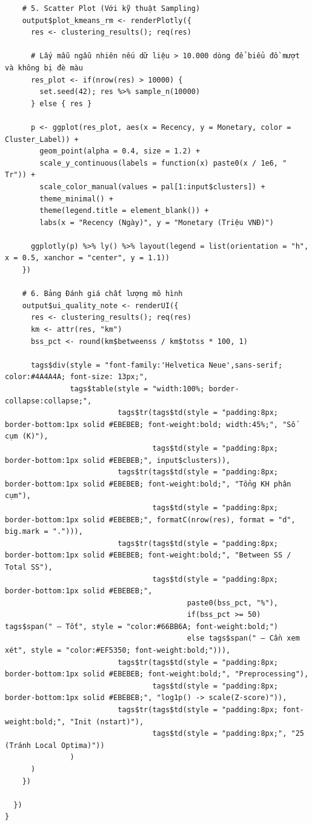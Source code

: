 \documentclass[12pt, a4paper]{article}
\begin{document}
\begin{lstlisting}
    # 5. Scatter Plot (Với kỹ thuật Sampling)
    output$plot_kmeans_rm <- renderPlotly({
      res <- clustering_results(); req(res)
      
      # Lấy mẫu ngẫu nhiên nếu dữ liệu > 10.000 dòng để biểu đồ mượt và không bị đè màu
      res_plot <- if(nrow(res) > 10000) { 
        set.seed(42); res %>% sample_n(10000) 
      } else { res }
      
      p <- ggplot(res_plot, aes(x = Recency, y = Monetary, color = Cluster_Label)) +
        geom_point(alpha = 0.4, size = 1.2) + 
        scale_y_continuous(labels = function(x) paste0(x / 1e6, " Tr")) + 
        scale_color_manual(values = pal[1:input$clusters]) +
        theme_minimal() +
        theme(legend.title = element_blank()) +
        labs(x = "Recency (Ngày)", y = "Monetary (Triệu VNĐ)")
      
      ggplotly(p) %>% ly() %>% layout(legend = list(orientation = "h", x = 0.5, xanchor = "center", y = 1.1))
    })
    
    # 6. Bảng Đánh giá chất lượng mô hình
    output$ui_quality_note <- renderUI({
      res <- clustering_results(); req(res)
      km <- attr(res, "km")
      bss_pct <- round(km$betweenss / km$totss * 100, 1)
      
      tags$div(style = "font-family:'Helvetica Neue',sans-serif; color:#4A4A4A; font-size: 13px;",
               tags$table(style = "width:100%; border-collapse:collapse;",
                          tags$tr(tags$td(style = "padding:8px; border-bottom:1px solid #EBEBEB; font-weight:bold; width:45%;", "Số cụm (K)"),
                                  tags$td(style = "padding:8px; border-bottom:1px solid #EBEBEB;", input$clusters)),
                          tags$tr(tags$td(style = "padding:8px; border-bottom:1px solid #EBEBEB; font-weight:bold;", "Tổng KH phân cụm"),
                                  tags$td(style = "padding:8px; border-bottom:1px solid #EBEBEB;", formatC(nrow(res), format = "d", big.mark = "."))),
                          tags$tr(tags$td(style = "padding:8px; border-bottom:1px solid #EBEBEB; font-weight:bold;", "Between SS / Total SS"),
                                  tags$td(style = "padding:8px; border-bottom:1px solid #EBEBEB;",
                                          paste0(bss_pct, "%"),
                                          if(bss_pct >= 50) tags$span(" — Tốt", style = "color:#66BB6A; font-weight:bold;")
                                          else tags$span(" — Cần xem xét", style = "color:#EF5350; font-weight:bold;"))),
                          tags$tr(tags$td(style = "padding:8px; border-bottom:1px solid #EBEBEB; font-weight:bold;", "Preprocessing"),
                                  tags$td(style = "padding:8px; border-bottom:1px solid #EBEBEB;", "log1p() -> scale(Z-score)")),
                          tags$tr(tags$td(style = "padding:8px; font-weight:bold;", "Init (nstart)"),
                                  tags$td(style = "padding:8px;", "25 (Tránh Local Optima)"))
               )
      )
    })
    
  })
}
\end{lstlisting}
\newpage
\end{document}
